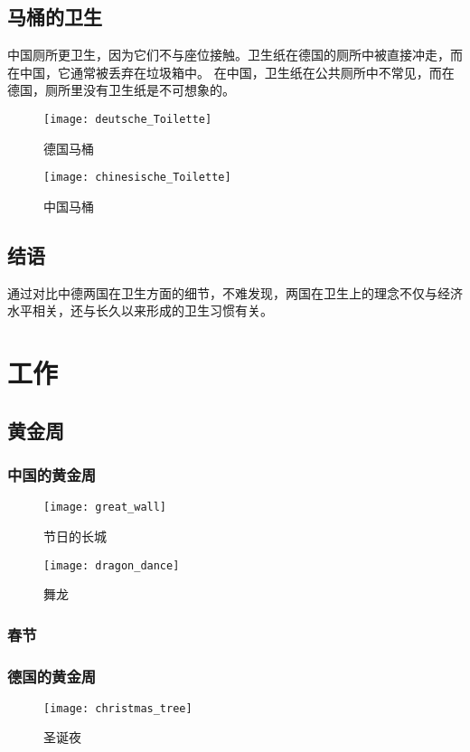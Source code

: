 \subsection{马桶的卫生}
    中国厕所更卫生，因为它们不与座位接触。卫生纸在德国的厕所中被直接冲走，而在中国，它通常被丢弃在垃圾箱中。 在中国，卫生纸在公共厕所中不常见，而在德国，厕所里没有卫生纸是不可想象的。

    \begin{figure}[htb]
        \centering
        \texttt{[image: deutsche\_Toilette]}
        \caption{德国马桶}
    \end{figure}

    \begin{figure}[htb]
        \centering
        \texttt{[image: chinesische\_Toilette]}
        \caption{中国马桶}
    \end{figure}

\subsection{结语}
    通过对比中德两国在卫生方面的细节，不难发现，两国在卫生上的理念不仅与经济水平相关，还与长久以来形成的卫生习惯有关。


\section{工作}
\subsection{黄金周}
\subsubsection{中国的黄金周}
\begin{figure}[htb]
    \centering
    \texttt{[image: great\_wall]}
    \caption{节日的长城}
\end{figure}
\begin{figure}[htb]
    \centering
    \texttt{[image: dragon\_dance]}
    \caption{舞龙}
\end{figure}

\subsubsection{春节}

\subsubsection{德国的黄金周}
\begin{figure}[htb]
    \centering
    \texttt{[image: christmas\_tree]}
    \caption{圣诞夜}
\end{figure}

